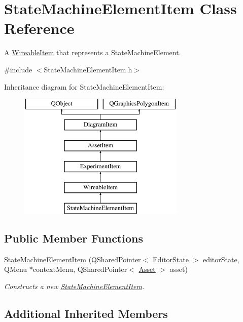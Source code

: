 \hypertarget{class_state_machine_element_item}{\section{State\-Machine\-Element\-Item Class Reference}
\label{class_state_machine_element_item}
}


A \hyperlink{class_wireable_item}{Wireable\-Item} that represents a State\-Machine\-Element.  




{\ttfamily \#include $<$State\-Machine\-Element\-Item.\-h$>$}

Inheritance diagram for State\-Machine\-Element\-Item\-:\begin{figure}[H]
\begin{center}
\leavevmode
\includegraphics[height=6.000000cm]{class_state_machine_element_item}
\end{center}
\end{figure}
\subsection*{Public Member Functions}
\begin{DoxyCompactItemize}
\item 
\hyperlink{class_state_machine_element_item_a8f4ddd653e00d422e8eb5312a79bf6e7}{State\-Machine\-Element\-Item} (Q\-Shared\-Pointer$<$ \hyperlink{class_editor_state}{Editor\-State} $>$ editor\-State, Q\-Menu $\ast$context\-Menu, Q\-Shared\-Pointer$<$ \hyperlink{class_picto_1_1_asset}{Asset} $>$ asset)
\begin{DoxyCompactList}\small\item\em Constructs a new \hyperlink{class_state_machine_element_item}{State\-Machine\-Element\-Item}. \end{DoxyCompactList}\end{DoxyCompactItemize}
\subsection*{Additional Inherited Members}


